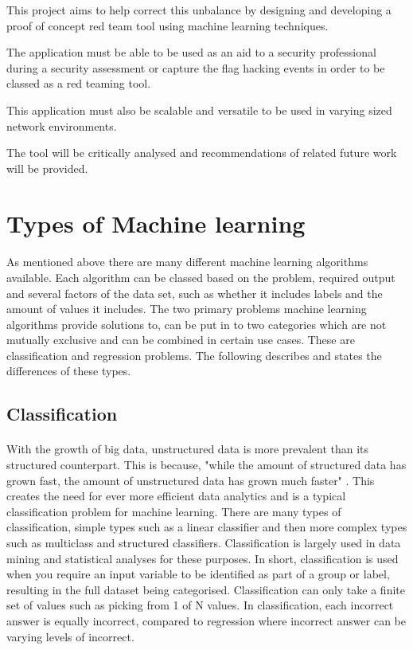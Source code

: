 This project aims to help correct this unbalance by designing and developing a proof of concept red team tool using machine learning techniques.

The application must be able to be used as an aid to a security professional during a security assessment or capture the flag hacking events in order to be classed as a red teaming tool.

This application must also be scalable and versatile to be used in varying sized network environments.

The tool will be critically analysed and recommendations of related future work will be provided.

\section{Types of Machine learning}
\label{sec:section4}

\paragraph{}As mentioned above there are many different machine learning algorithms available. Each algorithm can be classed based on the problem, required output and several factors of the data set, such as whether it includes labels and the amount of values it includes. The two primary problems machine learning algorithms provide solutions to, can be put in to two categories which are not mutually exclusive and can be combined in certain use cases. These are classification and regression problems. The following describes and states the differences of these types.

\subsection{Classification} 
\label{ssec:subsection1}

\paragraph{}With the growth of big data, unstructured data is more prevalent than its structured counterpart. This is because, "while the amount of structured data has grown fast, the amount of unstructured data has grown much faster" \cite{bigData}. This creates the need for ever more efficient data analytics and is a typical classification problem for machine learning. There are many types of classification, simple types such as a linear classifier and then more complex types such as multiclass and structured classifiers. Classification is largely used in data mining and statistical analyses for these purposes. In short, classification is used when you require an input variable to be identified as part of a group or label, resulting in the full dataset being categorised. Classification can only take a finite set of values such as picking from 1 of N values. In classification, each incorrect answer is equally incorrect, compared to regression where incorrect answer can be varying levels of incorrect.

